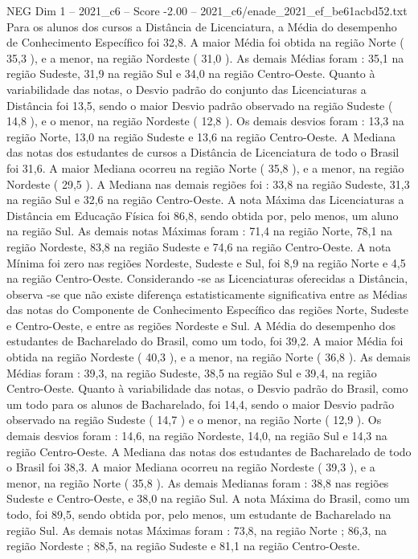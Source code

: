 \begin{textsample}{NEG Dim 1 – 2021\_c6 – Score -2.00 – 2021\_c6/enade\_2021\_ef\_be61acbd52.txt}
Para os alunos dos cursos a Distância de Licenciatura, a Média do desempenho de Conhecimento Específico foi 32,8.
A maior Média foi obtida na região Norte ( 35,3 ), e a menor, na região Nordeste ( 31,0 ).
As demais Médias foram : 35,1 na região Sudeste, 31,9 na região Sul e 34,0 na região Centro-Oeste.
Quanto à variabilidade das notas, o Desvio padrão do conjunto das Licenciaturas a Distância foi 13,5, sendo o maior Desvio padrão observado na região Sudeste ( 14,8 ), e o menor, na região Nordeste ( 12,8 ).
Os demais desvios foram : 13,3 na região Norte, 13,0 na região Sudeste e 13,6 na região Centro-Oeste.
A Mediana das notas dos estudantes de cursos a Distância de Licenciatura de todo o Brasil foi 31,6.
A maior Mediana ocorreu na região Norte ( 35,8 ), e a menor, na região Nordeste ( 29,5 ).
A Mediana nas demais regiões foi : 33,8 na região Sudeste, 31,3 na região Sul e 32,6 na região Centro-Oeste.
A nota Máxima das Licenciaturas a Distância em Educação Física foi 86,8, sendo obtida por, pelo menos, um aluno na região Sul.
As demais notas Máximas foram : 71,4 na região Norte, 78,1 na região Nordeste, 83,8 na região Sudeste e 74,6 na região Centro-Oeste.
A nota Mínima foi zero nas regiões Nordeste, Sudeste e Sul, foi 8,9 na região Norte e 4,5 na região Centro-Oeste.
Considerando -se as Licenciaturas oferecidas a Distância, observa -se que não existe diferença estatisticamente significativa entre as Médias das notas do Componente de Conhecimento Específico das regiões Norte, Sudeste e Centro-Oeste, e entre as regiões Nordeste e Sul.
A Média do desempenho dos estudantes de Bacharelado do Brasil, como um todo, foi 39,2.
A maior Média foi obtida na região Nordeste ( 40,3 ), e a menor, na região Norte ( 36,8 ).
As demais Médias foram : 39,3, na região Sudeste, 38,5 na região Sul e 39,4, na região Centro-Oeste.
Quanto à variabilidade das notas, o Desvio padrão do Brasil, como um todo para os alunos de Bacharelado, foi 14,4, sendo o maior Desvio padrão observado na região Sudeste ( 14,7 ) e o menor, na região Norte ( 12,9 ).
Os demais desvios foram : 14,6, na região Nordeste, 14,0, na região Sul e 14,3 na região Centro-Oeste.
A Mediana das notas dos estudantes de Bacharelado de todo o Brasil foi 38,3.
A maior Mediana ocorreu na região Nordeste ( 39,3 ), e a menor, na região Norte ( 35,8 ).
As demais Medianas foram : 38,8 nas regiões Sudeste e Centro-Oeste, e 38,0 na região Sul.
A nota Máxima do Brasil, como um todo, foi 89,5, sendo obtida por, pelo menos, um estudante de Bacharelado na região Sul.
As demais notas Máximas foram : 73,8, na região Norte ; 86,3, na região Nordeste ; 88,5, na região Sudeste e 81,1 na região Centro-Oeste.

\end{textsample}
